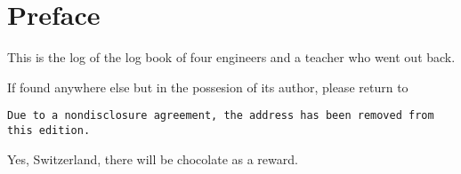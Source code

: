 \chapter{Preface}

This is the log of the log book of four engineers and a teacher who went out back.

\bigskip

If found anywhere else but in the possesion of its author, please return to

\smallskip
\texttt{Due to a nondisclosure agreement, the address has been removed from this edition.}
\smallskip

Yes, Switzerland, there will be chocolate as a reward.